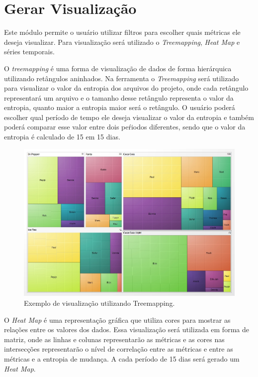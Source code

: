 \section{Gerar Visualização}
Este módulo permite o usuário utilizar filtros para escolher quais métricas ele deseja visualizar. Para visualização será utilizado o \textit{Treemapping}, \textit{Heat Map} e séries temporais.

O \textit{treemapping} é uma forma de visualização de dados de forma hierárquica utilizando retângulos aninhados. Na ferramenta o \textit{Treemapping} será utilizado para visualizar o valor da entropia dos arquivos do projeto, onde cada retângulo representará um arquivo e o tamanho desse retângulo representa o valor da entropia, quanto maior a entropia maior será o retângulo. O usuário poderá escolher qual período de tempo ele deseja visualizar o valor da entropia e também poderá comparar esse valor entre dois peŕiodos diferentes, sendo que o valor da entropia é calculado de 15 em 15 dias.

\begin{figure}[H]
	\captionsetup{justification=centering}
	\centerline{\includegraphics[scale=0.2]{treemap.jpg}}
	\caption{Exemplo de visualização utilizando Treemapping.}
	\label{figura:visaometodo}
\end{figure}

O \textit{Heat Map} é uma representação gráfica que utiliza cores para mostrar as relações entre os valores dos dados. Essa visualização será utilizada em forma de matriz, onde as linhas e colunas representarão as métricas e as cores nas intersecções representarão o nível de correlação entre as métricas e entre as métricas e a entropia de mudança. A cada período de 15 dias será gerado um \textit{Heat Map}.

